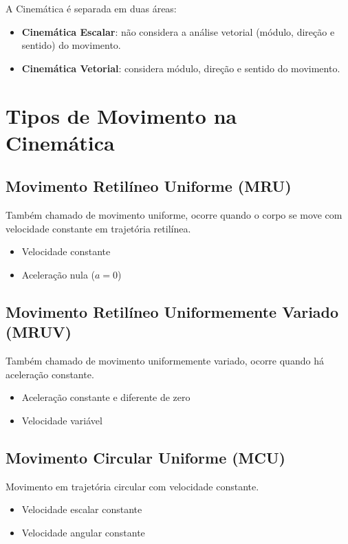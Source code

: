 \documentclass[a4paper,12pt]{article}
\begin{document}
A Cinemática é separada em duas áreas:

\begin{itemize}
    \item \textbf{Cinemática Escalar}: não considera a análise vetorial (módulo, direção e sentido) do movimento.
    \item \textbf{Cinemática Vetorial}: considera módulo, direção e sentido do movimento.
\end{itemize}

\section{Tipos de Movimento na Cinemática}

\subsection{Movimento Retilíneo Uniforme (MRU)}

Também chamado de movimento uniforme, ocorre quando o corpo se move com velocidade constante em trajetória retilínea.

\begin{itemize}
    \item Velocidade constante
    \item Aceleração nula ($a = 0$)
\end{itemize}

\subsection{Movimento Retilíneo Uniformemente Variado (MRUV)}

Também chamado de movimento uniformemente variado, ocorre quando há aceleração constante.

\begin{itemize}
    \item Aceleração constante e diferente de zero
    \item Velocidade variável
\end{itemize}

\subsection{Movimento Circular Uniforme (MCU)}

Movimento em trajetória circular com velocidade constante.

\begin{itemize}
    \item Velocidade escalar constante
    \item Velocidade angular constante
\end{itemize}
\end{document}
